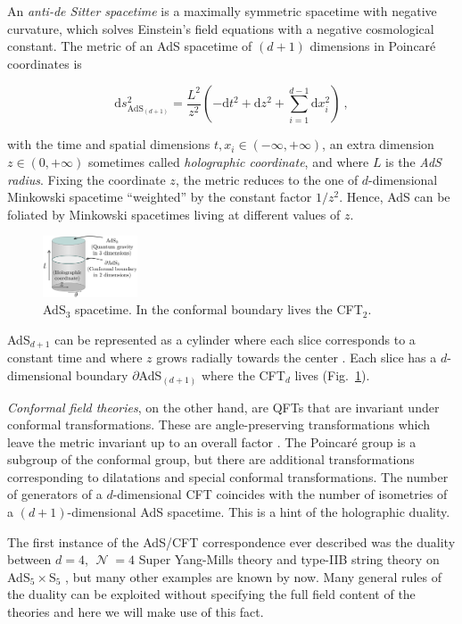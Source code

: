 \documentclass[twocolumn]{revtex4}
\providecommand{\eq}[2]{
    \begin{equation}
        #2
    \label{eq:#1}
    \end{equation}
}
\DeclareMathOperator{\calN}{\mathcal{N}}
\begin{document}
An \emph{anti-de Sitter spacetime} is a maximally symmetric spacetime with negative curvature, which solves Einstein's field equations with a negative cosmological constant. The metric of an AdS spacetime of $(d+1)$ dimensions in Poincar\'e coordinates is 
\eq{AdS_PP-metric}{
    \mathrm{d} s_{\text{AdS}_{(d+1)}}^2 = \frac{L^2}{z^2} \left( -\mathrm{d} t^2 + \mathrm{d} z^2 + \sum_{i=1}^{d-1} \mathrm{d} x_i^2 \right) \ ,
}
with the time and spatial dimensions $t , x_i \in (-\infty,+\infty)$, an extra dimension $z \in (0,+\infty)$ sometimes called \emph{holographic coordinate}, and where $L$ is the \emph{AdS radius}. Fixing the coordinate $z$, the metric reduces to the one of $d$-dimensional Minkowski spacetime ``weighted'' by the constant factor $1/z^2$. Hence, AdS can be foliated by Minkowski spacetimes living at different values of $z$.


\begin{figure}
    \centering
    \includegraphics[width=0.25\textwidth]{../../../Imatges/AdS_Cylindric.png}
\caption{AdS$_3$ spacetime. In the conformal boundary lives the CFT$_2$.}
\label{fig:AdS}
\end{figure}

AdS$_{d+1}$ can be represented as a cylinder where each slice corresponds to a constant time and where  $z$ grows radially towards the center \cite{hawking_large_2008}. Each slice has a $d$-dimensional boundary $\partial$AdS$_{(d+1)}$ where the CFT$_d$ lives (Fig.~\ref{fig:AdS}).

\emph{Conformal field theories}, on the other hand, are QFTs that are invariant under conformal transformations. These are angle-preserving transformations which leave the metric invariant up to an overall factor \cite{di_francesco_conformal_1997}. The Poincar\'e group is a subgroup of the conformal group, but there are additional transformations corresponding to dilatations and special conformal transformations. The number of generators of a $d$-dimensional CFT coincides with the number of isometries of a $(d+1)$-dimensional AdS spacetime. This is a hint of the holographic duality.

The first instance of the AdS/CFT correspondence ever described was the duality between $d=4$, $\calN=4$ Super Yang-Mills theory and type-IIB string theory on AdS$_5 \times $S$_5$ \cite{maldacena_large_1999}, but many other examples are known by now. Many general rules of the duality can be exploited without specifying the full field content of the theories and here we will make use of this fact.
\end{document}
